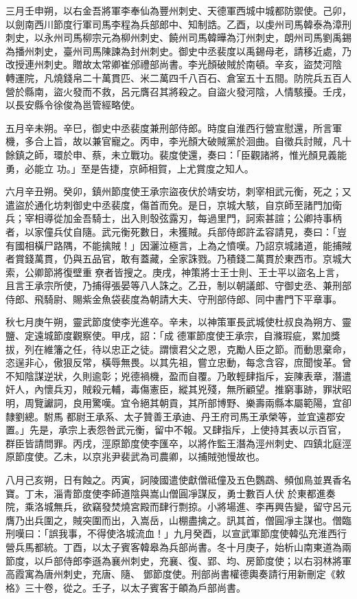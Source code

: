 \begin{pinyinscope}
 三月壬申朔，以右金吾將軍李奉仙為豐州刺史、天德軍西城中城都防禦使。己卯，以劍南西川節度行軍司馬李程為兵部郎中、知制誥。乙酉，以虔州司馬韓泰為漳刑刺史，以永州司馬柳宗元為柳州刺史、饒州司馬韓曄為汀州刺史，朗州司馬劉禹錫為播州刺史，臺州司馬陳諫為封州刺史。御史中丞裴度以禹錫母老，請移近處，乃改授連州刺史。贈故太常卿崔邠禮部尚書。李光顏破賊於南頓。辛亥，盜焚河陰
 轉運院，凡燒錢帛二十萬貫匹、米二萬四千八百石、倉室五十五間。防院兵五百人營於縣南，盜火發而不救，呂元膺召其將殺之。自盜火發河陰，人情駭擾。壬戌，以長安縣令徐俊為邕管經略使。



 五月辛未朔。辛巳，御史中丞裴度兼刑部侍郎。時度自淮西行營宣慰還，所言軍機，多合上旨，故以兼官寵之。丙申，李光顏大破賊黨於洄曲。自徵兵討賊，凡十餘鎮之師，環於申、蔡，未立戰功。裴度使還，奏曰：「臣觀諸將，惟光顏見義能勇，必能立
 功。」至是告捷，京師相賀，上尤賞度之知人。



 六月辛丑朔。癸卯，鎮州節度使王承宗盜夜伏於靖安坊，刺宰相武元衡，死之；又遣盜於通化坊刺御史中丞裴度，傷首而免。是日，京城大駭，自京師至諸門加衛兵；宰相導從加金吾騎士，出入則彀弦露刃，每過里門，訶索甚諠；公卿持事柄者，以家僮兵仗自隨。武元衡死數日，未獲賊。兵部侍郎許孟容請見，奏曰：「豈有國相橫尸路隅，不能擒賊！」因灑泣極言，上為之憤嘆。乃詔京城諸道，能捕賊
 者賞錢萬貫，仍與五品官，敢有蓋藏，全家誅戮。乃積錢二萬貫於東西市。京城大索，公卿節將復壁重尞者皆搜之。庚戌，神策將士王士則、王士平以盜名上言，且言王承宗所使，乃捕得張晏等八人誅之。乙丑，制以朝議郎、守御史丞、兼刑部侍郎、飛騎尉、賜紫金魚袋裴度為朝請大夫、守刑部侍郎、同中書門下平章事。



 秋七月庚午朔，靈武節度使李光進卒。辛未，以神策軍長武城使杜叔良為朔方、靈鹽、定遠城節度觀察使。甲戌，詔：「成
 德軍節度使王承宗，自滌瑕疵，累加獎拔，列在維籓之任，待以忠正之徒。謂懷君父之恩，克勵人臣之節。而動思棄命，恣逞非心，傲狠反常，橫辱無畏。以其先祖，嘗立忠動，每念含容，庶聞悛革。曾不知陰謀逆狀，久則逾彰；兇德禍機，盈而自覆。乃敢輕肆指斥，妄陳表章，潛遣奸人，內懷兵刃，賊殺元輔，毒傷憲臣，縱其兇殘，無所顧望。推窮事跡，罪狀昭明，周覽讞詞，良用驚嘆。宜令絕其朝貢，其所部博野、樂壽兩縣本屬範陽，宜卻隸劉總。駙馬
 都尉王承系、太子贊善王承迪、丹王府司馬王承榮等，並宜遠郡安置。」先是，承宗上表怨咎武元衡，留中不報。又肆指斥，上使持其表以示百官，群臣皆請問罪。丙戌，涇原節度使李匯卒，以將作監王潛為涇州刺史、四鎮北庭涇原節度使。乙未，以京兆尹裴武為司農卿，以捕賊弛慢故也。



 八月己亥朔，日有蝕之。丙寅，訶陵國遣使獻僧祗僮及五色鸚鵡、頻伽鳥並異香名寶。丁未，淄青節度使李師道陰與嵩山僧圓凈謀反，勇士數百人伏
 於東都進奏院，乘洛城無兵，欲竊發焚燒宮殿而肆行剽掠。小將場進、李再興告變，留守呂元膺乃出兵圍之，賊突圍而出，入嵩岳，山棚盡擒之。訊其首，僧圓凈主謀也。僧臨刑嘆曰：「誤我事，不得使洛城流血！」九月癸酉，以宣武軍節度使韓弘充淮西行營兵馬都統。丁酉，以太子賓客韓皋為兵部尚書。冬十月庚子，始析山南東道為兩節度，以戶部侍郎李遜為襄州刺史，充襄、復、郢、均、房節度使；以右羽林將軍高霞寓為唐州刺史，充唐、隨、
 鄧節度使。刑部尚書權德輿奏請行用新刪定《敕格》三十卷，從之。壬子，以太子賓客于頔為戶部尚書。




\end{pinyinscope}
